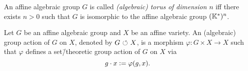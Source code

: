 \begin{defi}
	An affine algebraic group $G$ is called \emph{(algebraic) torus of dimension $n$} iff there exists $n>0$ such that $G$ is isomorphic to the affine algebraic group $(\mathbb{K}^*)^n$.
\end{defi}


\begin{defi}
	Let $G$ be an affine algebraic group and $X$ be an affine variety. An (algebraic) group action of $G$ on $X$, denoted by $G{\ \circlearrowleft\ } X$, is a morphism $\varphi\colon G\times X \rightarrow X$ such that $\varphi$ defines a set\=/theoretic group action of $G$ on $X$ via
	$$g\cdot x \mathrel{\mathop:}= \varphi(g,x).$$
\end{defi}


